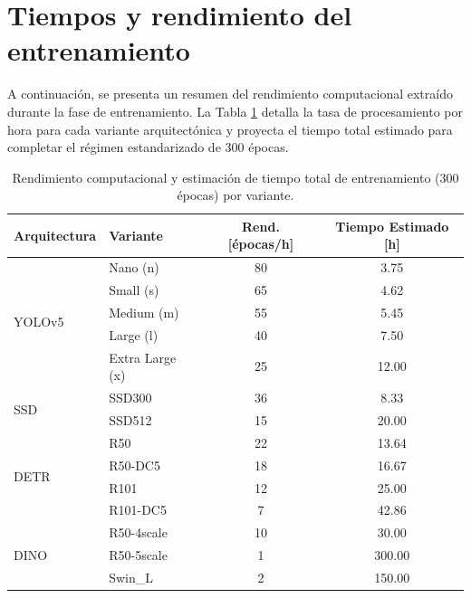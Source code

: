 
\section{Tiempos y rendimiento del entrenamiento}

A continuación, se presenta un resumen del rendimiento computacional extraído durante la fase de entrenamiento. La Tabla \ref{tab:4.2-tiempos-entrenamiento} detalla la tasa de procesamiento por hora para cada variante arquitectónica y proyecta el tiempo total estimado para completar el régimen estandarizado de 300 épocas.\\

\begin{table}[H]
    \centering
    \caption{Rendimiento computacional y estimación de tiempo total de entrenamiento (300 épocas) por variante.}
    \begin{tabular}{|l|l|c|c|}
        \hline
        \textbf{Arquitectura} & \textbf{Variante} & \textbf{Rend. [épocas/h]} & \textbf{Tiempo Estimado [h]} \\
        \hline
        \multirow{5}{*}{YOLOv5} & Nano (n) & 80 & 3.75 \\
        \cline{2-4}
        & Small (s) & 65 & 4.62 \\
        \cline{2-4}
        & Medium (m) & 55 & 5.45 \\
        \cline{2-4}
        & Large (l) & 40 & 7.50 \\
        \cline{2-4}
        & Extra Large (x) & 25 & 12.00 \\
        \hline
        \multirow{2}{*}{SSD} & SSD300 & 36 & 8.33 \\
        \cline{2-4}
        & SSD512 & 15 & 20.00 \\
        \hline
        \multirow{4}{*}{DETR} & R50 & 22 & 13.64 \\
        \cline{2-4}
        & R50-DC5 & 18 & 16.67 \\
        \cline{2-4}
        & R101 & 12 & 25.00 \\
        \cline{2-4}
        & R101-DC5 & 7 & 42.86 \\
        \hline
        \multirow{3}{*}{DINO} & R50-4scale & 10 & 30.00 \\
        \cline{2-4}
        & R50-5scale & 1 & 300.00 \\
        \cline{2-4}
        & Swin\_L & 2 & 150.00 \\
        \hline
    \end{tabular}
    \label{tab:4.2-tiempos-entrenamiento}
\end{table}

